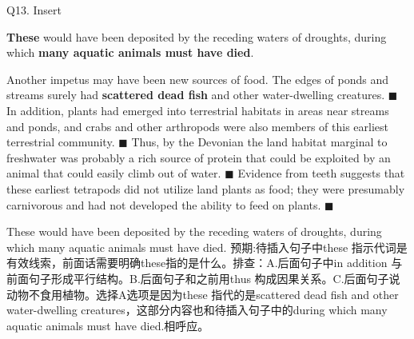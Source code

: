 \begin{blk}
    \begin{qst}
        Q13. Insert

        \textbf{These} would have been deposited by the receding waters of droughts, during which \textbf{many aquatic animals must have died}.
    \end{qst}

    \begin{psgq}
        Another impetus may have been new sources of food. The edges of ponds and streams surely had \textbf{scattered dead fish} and other water-dwelling creatures. $\blacksquare$ In addition, plants had emerged into terrestrial habitats in areas near streams and ponds, and crabs and other arthropods were also members of this earliest terrestrial community. $\blacksquare$ Thus, by the Devonian the land habitat marginal to freshwater was probably a rich source of protein that could be exploited by an animal that could easily climb out of water. $\blacksquare$ Evidence from teeth suggests that these earliest tetrapods did not utilize land plants as food; they were presumably carnivorous and had not developed the ability to feed on plants. $\blacksquare$
    \end{psgq}

    \begin{nlz}
        These would have been deposited by the receding waters of droughts, during which many aquatic animals must have died. 预期:待插入句子中these 指示代词是有效线索，前面话需要明确these指的是什么。排查：A.后面句子中in addition 与前面句子形成平行结构。B.后面句子和之前用thus 构成因果关系。C.后面句子说动物不食用植物。选择A选项是因为these 指代的是scattered dead fish and other water-dwelling creatures，这部分内容也和待插入句子中的during which many aquatic animals must have died.相呼应。
    \end{nlz}
\end{blk}
